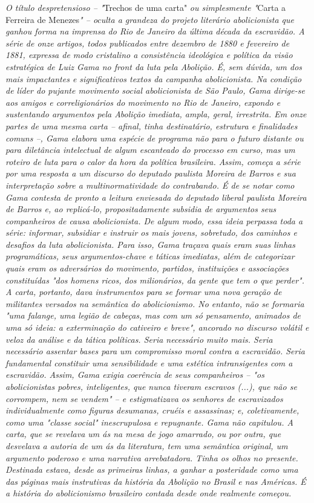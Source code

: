 \emph{O título despretensioso -- "}Trechos de uma carta" \emph{ou
simplesmente "}Carta a Ferreira de Menezes\emph{" -- oculta a grandeza
do projeto literário abolicionista que ganhou forma na imprensa do Rio
de Janeiro da última década da escravidão. A série de onze artigos,
todos publicados entre dezembro de 1880 e fevereiro de 1881, expressa de
modo cristalino a consistência ideológica e política da visão
estratégica de Luiz Gama no front da luta pela Abolição. É, sem dúvida,
um dos mais impactantes e significativos textos da campanha
abolicionista. Na condição de líder do pujante movimento social
abolicionista de São Paulo, Gama dirige-se aos amigos e correligionários
do movimento no Rio de Janeiro, expondo e sustentando argumentos pela
Abolição imediata, ampla, geral, irrestrita. Em onze partes de uma mesma
carta -- afinal, tinha destinatário, estrutura e finalidades comuns --,
Gama elabora uma espécie de programa não para o futuro distante ou para
diletância intelectual de algum escanteado do processo em curso, mas um
roteiro de luta para o calor da hora da política brasileira. Assim,
começa a série por uma resposta a um discurso do deputado paulista
Moreira de Barros e sua interpretação sobre a multinormatividade do
contrabando. É de se notar como Gama contesta de pronto a leitura
enviesada do deputado liberal paulista Moreira de Barros e, ao
replicá-lo, propositadamente subsidia de argumentos seus companheiros de
causa abolicionista. De algum modo, essa ideia perpassa toda a série:
informar, subsidiar e instruir os mais jovens, sobretudo, dos caminhos e
desafios da luta abolicionista. Para isso, Gama traçava quais eram suas
linhas programáticas, seus argumentos-chave e táticas imediatas, além de
categorizar quais eram os adversários do movimento, partidos,
instituições e associações constituídas "dos homens ricos, dos
milionários, da gente que tem o que perder". A carta, portanto, dava
instrumentos para se formar uma nova geração de militantes versados na
semântica do abolicionismo. No entanto, não se formaria "uma falange,
uma legião de cabeças, mas com um só pensamento, animados de uma só
ideia: a exterminação do cativeiro e breve", ancorado no discurso
volátil e veloz da análise e da tática políticas. Seria necessário muito
mais. Seria necessário assentar bases para um compromisso moral contra a
escravidão. Seria fundamental constituir uma sensibilidade e uma
estética intransigentes com a escravidão. Assim, Gama exigia coerência
de seus companheiros -- "os abolicionistas pobres, inteligentes, que
nunca tiveram escravos (...), que não se corrompem, nem se vendem" -- e
estigmatizava os senhores de escravizados individualmente como figuras
desumanas, cruéis e assassinas; e, coletivamente, como uma "classe
social" inescrupulosa e repugnante. Gama não capitulou. A carta, que se
revelava um ás na mesa de jogo amarrado, ou por outra, que desvelava a
autoria de um ás da literatura, tem uma semântica original, um argumento
poderoso e uma narrativa arrebatadora. Tinha os olhos no presente.
Destinada estava, desde as primeiras linhas, a ganhar a posteridade como
uma das páginas mais instrutivas da história da Abolição no Brasil e nas
Américas. É a história do abolicionismo brasileiro contada desde onde
realmente começou. }

